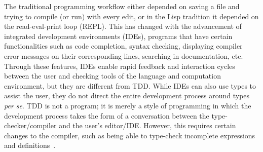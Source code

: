 The traditional programming workflow either depended on saving a file and
trying to compile (or run) with every edit, or in the Lisp tradition it
depended on the read-eval-print loop (REPL). This has changed with the
advancement of integrated development environments (IDEs), programs that have
certain functionalities such as code completion, syntax checking, displaying
compiler error messages on their corresponding lines, searching in
documentation, etc.
Through these features, IDEs enable rapid feedback and interaction cycles
between the user and checking tools of the language and computation
environment, but they are different from TDD. While IDEs can also use types to
assist the user, they do not direct the entire development process around types
\emph{per se}.
TDD is not a program; it is merely a style of programming in which
the development process takes the form of a conversation between the
type-checker/compiler and the user's editor/IDE.  However, this requires
certain changes to the compiler, such as being able to type-check incomplete
expressions and definitions~\cite{tdd}.

